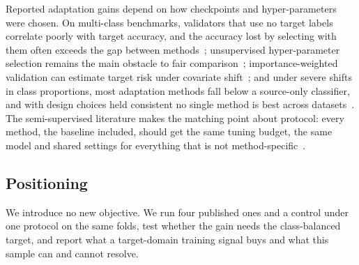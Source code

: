 Reported adaptation gains depend on how checkpoints and hyper-parameters were chosen. On
multi-class benchmarks, validators that use no target labels correlate poorly with target
accuracy, and the
accuracy lost by selecting with them often exceeds the gap between
methods~\citep{musgrave2021realitycheck}; unsupervised hyper-parameter selection remains the
main obstacle to fair comparison~\citep{skadabench2025}; importance-weighted validation can
estimate target risk under covariate shift~\citep{you2019dev}; and under severe shifts in class
proportions, most adaptation methods fall below a source-only classifier, and with design
choices held consistent no single method is best across datasets~\citep{rlsbench}. The semi-supervised literature makes the matching point
about protocol: every method, the baseline included, should get the same tuning budget, the
same model and shared settings for everything that is not method-specific~\citep{oliver2018realistic}.

\subsection{Positioning}

We introduce no new objective. We run four published ones and a control under one protocol on
the same folds, test whether the gain needs the class-balanced target, and report what a
target-domain training signal buys and what this sample can and cannot resolve.
